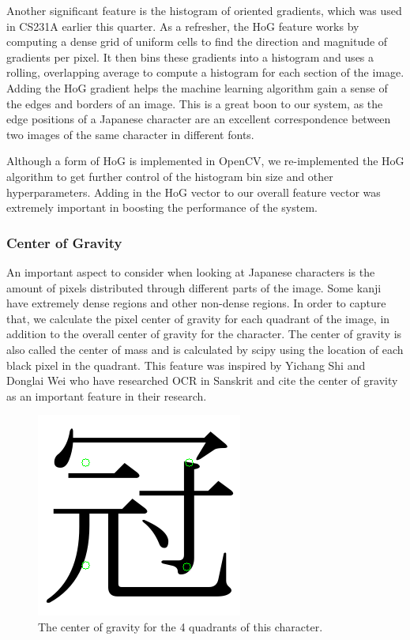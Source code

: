 \documentclass[10pt,twocolumn,letterpaper]{article}
\begin{document}
Another significant feature is the histogram of oriented gradients, which was used in CS231A earlier this quarter. As a refresher, the HoG feature works by computing a dense grid of uniform cells to find the direction and magnitude of gradients per pixel. It then bins these gradients into a histogram and uses a rolling, overlapping average to compute a histogram for each section of the image. Adding the HoG gradient helps the machine learning algorithm gain a sense of the edges and borders of an image. This is a great boon to our system, as the edge positions of a Japanese character are an excellent correspondence between two images of the same character in different fonts.

Although a form of HoG is implemented in OpenCV, we re-implemented the HoG algorithm to get further control of the histogram bin size and other hyperparameters. Adding in the HoG vector to our overall feature vector was extremely important in boosting the performance of the system.

\subsubsection{Center of Gravity}

An important aspect to consider when looking at Japanese characters is the amount of pixels distributed through different parts of the image. Some kanji have extremely dense regions and other non-dense regions. In order to capture that, we calculate the pixel center of gravity for each quadrant of the image, in addition to the overall center of gravity for the character. The center of gravity is also called the center of mass and is calculated by scipy using the location of each black pixel in the quadrant. This feature was inspired by Yichang Shi and Donglai Wei who have researched OCR in Sanskrit and cite the center of gravity as an important feature in their research.

\begin{figure}[t]
    \centering
    \includegraphics[width=0.7\columnwidth]{../cog.png}
    \caption{The center of gravity for the 4 quadrants of this character.}
\end{figure}
\end{document}
